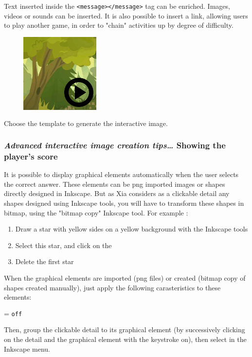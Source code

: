 \begin{astuce}
Text inserted inside the \verb|<message></message>| tag can be 
enriched. Images, videos or sounds can be inserted.
It is also possible to insert a link, allowing users to play another game,
in order to "chain" activities up by degree of difficulty.
\end{astuce}

\begin{figure}
  \centering
  \includegraphics[scale=0.7]{./images/game1clic} 
\end{figure}

Choose the template  to generate the interactive image.


\subsubsection{\emph{Advanced interactive image creation tips\ldots} Showing the player's score}

It is possible to display graphical elements automatically  when the user 
selects the correct answer. These elements can be png imported images or shapes directly designed in
Inkscape.
But as Xia considers as a clickable 
detail any shapes designed using Inkscape tools, you 
will have to transform these shapes in bitmap, using the "bitmap copy" Inkscape tool. 
For example :
\begin{enumerate}
 \item Draw  a star with yellow sides on a yellow background with the Inkscape tools 
 \item Select this star, and click on the 
 \item Delete the first star
\end{enumerate}

When the graphical elements are imported (png files) or created (bitmap copy 
of shapes created manually), just apply the following 
carasteristics to these elements:
\begin{center}
 = \verb|off|
\end{center}
Then, group the clickable detail to its graphical element (by successively 
clicking on the detail and the graphical element with the \Shift keystroke on),
then select  in the Inkscape  menu.

